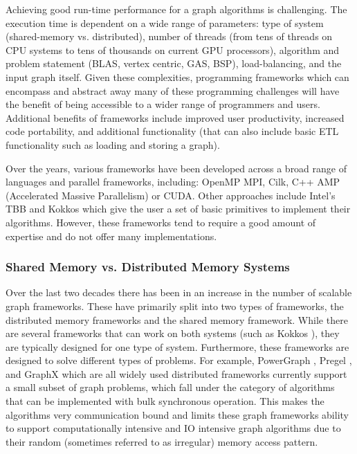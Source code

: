 Achieving good run-time performance for a graph algorithms is challenging. %
The execution time is dependent on a wide range of parameters: type of system (shared-memory vs. distributed), number of threads (from tens of threads on CPU systems to tens of thousands on current GPU processors), algorithm and problem statement (BLAS, vertex centric, GAS, BSP), load-balancing, and the input graph itself.  
Given these complexities, programming frameworks which can encompass and abstract away many of these programming challenges will have the benefit of being accessible to a wider range of programmers and users. Additional benefits of frameworks include improved user productivity, increased code portability, and additional functionality (that can also include basic ETL functionality such as loading and storing a graph).

Over the years, various frameworks have been developed across a broad range of languages and parallel frameworks, including: OpenMP MPI, Cilk, C++ AMP (Accelerated Massive Parallelism) or CUDA.  Other approaches include Intel's TBB and  Kokkos \cite{edwards2014kokkos} which give the user a set of basic primitives to implement their algorithms. However, these frameworks tend to require a good amount of expertise and do not offer many implementations. 



\subsubsection{Shared Memory vs. Distributed Memory Systems}
Over the last two decades there has been in an increase in the number of scalable graph frameworks. These have primarily split into two types of frameworks, the distributed memory frameworks and the shared memory framework. While there are several frameworks that can work on both systems (such as Kokkos \cite{edwards2014kokkos}), they are typically designed for one type of system.  Furthermore, these frameworks are designed to solve different types of problems. For example, PowerGraph \cite{powergraph}, Pregel \cite{pregel}, and GraphX \cite{gonzalez2014graphx} which are all widely used distributed frameworks currently support a small subset of graph problems, which fall under the category of algorithms that can be implemented with bulk synchronous operation. This makes the algorithms very communication bound and limits these graph frameworks ability to support computationally intensive and IO intensive graph algorithms due to their random (sometimes referred to as irregular) memory access pattern.

